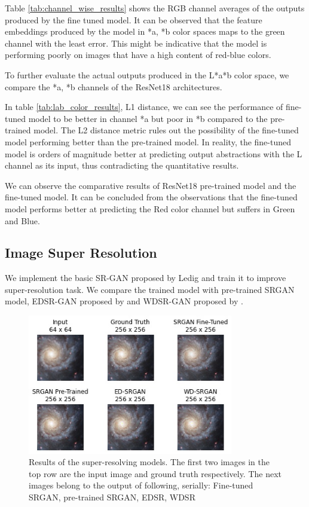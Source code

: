 \documentclass[oneside,a4paper,12pt]{report}
\begin{document}


Table \ref{tab:channel_wise_results} shows the RGB channel averages of the outputs produced by the fine tuned model. It can be observed that the feature embeddings produced by the model in *a, *b color spaces maps to the green channel with the least error. This might be indicative that the model is performing poorly on images that have a high content of red-blue colors. 

To further evaluate the actual outputs produced in the L*a*b color space, we compare the *a, *b channels of the ResNet18 architectures. 

 
In table \ref{tab:lab_color_results}, L1 distance, we can see the performance of fine-tuned model to be better in channel *a but poor in *b compared to the pre-trained model. The L2 distance metric rules out the possibility of the fine-tuned model performing better than the pre-trained model. In reality, the fine-tuned model is orders of magnitude better at predicting output abstractions with the L channel as its input, thus contradicting the quantitative results.


We can observe the comparative results of ResNet18 pre-trained model and the fine-tuned model. It can be concluded from the observations that the fine-tuned model performs better at predicting the Red color channel but suffers in Green and Blue.

\subsection{Image Super Resolution}
\hspace*{0.25 in}We implement the basic SR-GAN proposed by Ledig and train it to improve super-resolution task. We compare the trained model with pre-trained SRGAN model, EDSR-GAN proposed by \cite{lim2017enhanced} and WDSR-GAN proposed by \cite{yu2018wide}.

\begin{figure}[!htb]
	\includegraphics[width=0.8\textwidth]{figures/comparison_upscale}
	\caption{Results of the super-resolving models. The first two images in the top row are the input image and ground truth respectively. The next images belong to the output of following, serially: Fine-tuned SRGAN, pre-trained SRGAN, EDSR, WDSR}
	\label{fig: sr_results}
\end{figure}
\end{document}
